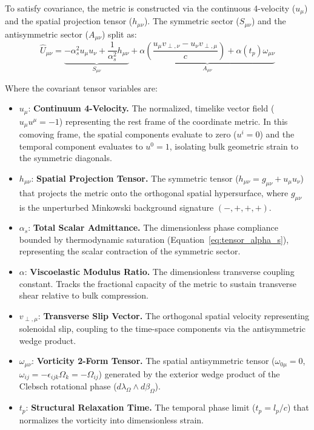 To satisfy covariance, the metric is constructed via the continuous 4-velocity ($u_\mu$) and the spatial projection tensor ($h_{\mu\nu}$). The symmetric sector ($S_{\mu\nu}$) and the antisymmetric sector ($A_{\mu\nu}$) split as:
\begin{equation}
    \hat{U}_{\mu\nu} = \underbrace{-\alpha_s^2 u_\mu u_\nu + \frac{1}{\alpha_s^2} h_{\mu\nu}}_{S_{\mu\nu}} + \underbrace{\alpha \left( \frac{u_\mu v_{\perp, \nu} - u_\nu v_{\perp, \mu}}{c} \right) + \alpha(t_p) \omega_{\mu\nu}}_{A_{\mu\nu}} \label{eq:covariant_tensor}
\end{equation}

Where the covariant tensor variables are:
    \begin{itemize}[noitemsep]
    \item $u_\mu$: \textbf{Continuum 4-Velocity.} The normalized, timelike vector field ($u_\mu u^\mu = -1$) representing the rest frame of the coordinate metric. In this comoving frame, the spatial components evaluate to zero ($u^i = 0$) and the temporal component evaluates to $u^0 = 1$, isolating bulk geometric strain to the symmetric diagonals. %
    \item $h_{\mu\nu}$: \textbf{Spatial Projection Tensor.} The symmetric tensor ($h_{\mu\nu} = g_{\mu\nu} + u_\mu u_\nu$) that projects the metric onto the orthogonal spatial hypersurface, where $g_{\mu\nu}$ is the unperturbed Minkowski background signature $(-,+,+,+)$.
    \item $\alpha_s$: \textbf{Total Scalar Admittance.} The dimensionless phase compliance bounded by thermodynamic saturation (Equation~\ref{eq:tensor_alpha_s}), representing the scalar contraction of the symmetric sector. %
    \item $\alpha$: \textbf{Viscoelastic Modulus Ratio.} The dimensionless transverse coupling constant. Tracks the fractional capacity of the metric to sustain transverse shear relative to bulk compression. 
    \item $v_{\perp, \mu}$: \textbf{Transverse Slip Vector.} The orthogonal spatial velocity representing solenoidal slip, coupling to the time-space components via the antisymmetric wedge product.
    \item $\omega_{\mu\nu}$: \textbf{Vorticity 2-Form Tensor.} The spatial antisymmetric tensor ($\omega_{0\mu} = 0$, $\omega_{ij} = -\epsilon_{ijk}\Omega_k = -\Omega_{ij}$) generated by the exterior wedge product of the Clebsch rotational phase ($d\lambda_\Omega \wedge d\beta_\Omega$). %
    \item $t_p$: \textbf{Structural Relaxation Time.} The temporal phase limit ($t_p = l_p/c$) that normalizes the vorticity into dimensionless strain.
\end{itemize}

